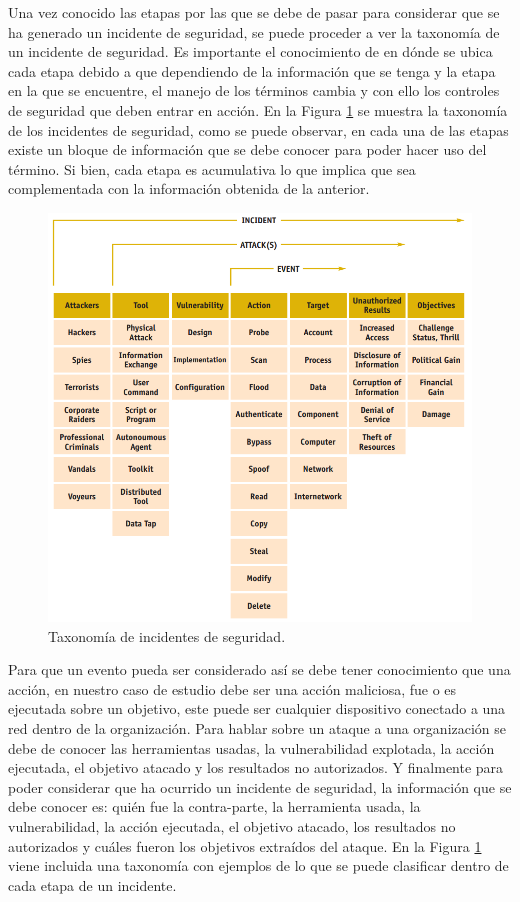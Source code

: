Una vez conocido las etapas por las que se debe de pasar para considerar que se ha generado un incidente de seguridad, se puede proceder a ver la taxonomía de un incidente de seguridad. Es importante el conocimiento de en dónde se ubica cada etapa debido a que dependiendo de la información que se tenga y la etapa en la que se encuentre, el manejo de los términos cambia y con ello los controles de seguridad que deben entrar en acción. En la Figura \ref{fig:tax_seg} se muestra la taxonomía de los incidentes de seguridad, como se puede observar, en cada una de las etapas existe un bloque de información que se debe conocer para poder hacer uso del término. Si bien, cada etapa es acumulativa lo que implica que sea complementada con la información obtenida de la anterior. \\

\begin{figure}
	\centering
	\includegraphics[scale=.4]{images/taxonomia_incidente}
	\caption{Taxonomía de incidentes de seguridad.}
	\label{fig:tax_seg}
\end{figure}


Para que un evento pueda ser considerado así se debe tener conocimiento que una acción, en nuestro caso de estudio debe ser una acción maliciosa, fue o es ejecutada sobre un objetivo, este puede ser cualquier dispositivo conectado a una red dentro de la organización. Para hablar sobre un ataque a una organización se debe de conocer las herramientas usadas, la vulnerabilidad explotada, la acción ejecutada, el objetivo atacado y los resultados no autorizados. Y finalmente para poder considerar que ha ocurrido un incidente de seguridad, la información que se debe conocer es: quién fue la contra-parte, la herramienta usada, la vulnerabilidad, la acción ejecutada, el objetivo atacado, los resultados no autorizados y cuáles fueron los objetivos extraídos del ataque. En la Figura \ref{fig:tax_seg} viene incluida una taxonomía con ejemplos de lo que se puede clasificar dentro de cada etapa de un incidente.